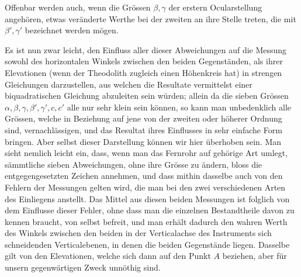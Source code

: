 \par\clearpage
{}
Offenbar werden auch, wenn die Grössen $\beta,\gamma$ der erstern Ocularstellung angehören, etwas veränderte Werthe bei der zweiten an ihre Stelle treten, die mit $\beta',\gamma'$ bezeichnet werden mögen.

Es ist nun zwar leicht, den Einfluss aller dieser Abweichungen auf die Messung sowohl des horizontalen Winkels zwischen den beiden Gegenständen, als ihrer Elevationen (wenn der Theodolith zugleich einen Höhenkreis hat) in strengen Gleichungen darzustellen, aus welchen die Resultate vermittelst einer biquadratischen Gleichung abzuleiten sein würden; allein da die sieben Grössen $\alpha,\beta,\gamma,\beta',\gamma',c,c'$ alle nur sehr klein sein können, so kann man unbedenklich alle Grössen, welche in Beziehung auf jene von der zweiten oder höherer Ordnung sind, vernachlässigen, und das Resultat ihres Einflusses in sehr einfache Form bringen. Aber selbst dieser Darstellung können wir hier überhoben sein. Man sieht nemlich leicht ein, dass, wenn man das Fernrohr auf gehörige Art umlegt, sämmtliche sieben Abweichungen, ohne ihre Grösse zu ändern, bloss die entgegengesetzten Zeichen annehmen, und dass mithin dasselbe auch von den Fehlern der Messungen gelten wird, die man bei den zwei verschiedenen Arten des Einliegens anstellt. Das Mittel aus diesen beiden Messungen ist folglich von dem Einflusse dieser Fehler, ohne dass man die einzelnen Bestandtheile davon zu kennen braucht, von selbst befreit, und man erhält dadurch den wahren Werth des Winkels zwischen den beiden in der Verticalachse des Instruments sich schneidenden Verticalebenen, in denen die beiden Gegenstände liegen. Dasselbe gilt von den Elevationen, welche sich dann auf den Punkt $A$ beziehen, aber für unsern gegenwärtigen Zweck unnöthig sind.

